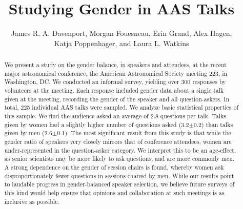 \documentclass[iop]{emulateapj}
\begin{document}
\title{Studying Gender in AAS Talks}
\author{
	James R. A. Davenport,
	Morgan Fouesneau,
	Erin Grand,
	Alex Hagen,\\
	Katja Poppenhager,
	and Laura L. Watkins
	}





\begin{abstract}
We present a study on the gender balance, in speakers and attendees, at the recent major astronomical conference, the American Astronomical Society meeting 223, in Washington, DC. We conducted an informal survey, yielding over 300 responses by volunteers at the meeting. Each response included gender data about a single talk given at the meeting, recording the gender of the speaker and all question-askers. In total, 225 individual AAS talks were sampled. We analyze basic statistical properties of this sample. We find the audience asked an average of 2.8 questions per talk. Talks given by women had a slightly higher number of questions asked (3.2$\pm$0.2) than talks given by men (2.6$\pm$0.1).
 The most significant result from this study is that while the gender ratio of speakers very closely mirrors that of conference attendees, women are under-represented in the question-asker category.  We interpret this to be an age-effect, as senior scientists may be more likely to ask questions, and are more commonly men. A strong dependence on the gender of session chairs is found, whereby women ask disproportionately fewer questions in sessions chaired by men. While our results point to laudable progress in gender-balanced speaker selection, we believe future surveys of this kind would help ensure that opinions and collaboration at such meetings is as inclusive as possible.
\end{abstract}
\end{document}
